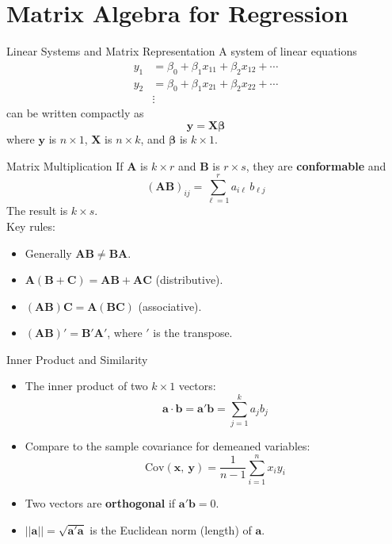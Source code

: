 \documentclass[aspectratio=169, handout, t]{beamer}
\numberwithin{equation}{section}
\begin{document}
\section[Matrices]{Matrix Algebra for Regression}


\begin{frame}{Linear Systems and Matrix Representation}
A system of linear equations
\begin{align*}
y_1&=\beta_0+\beta_1 x_{11}+\beta_2 x_{12}+\cdots\\
y_2&=\beta_0+\beta_1 x_{21}+\beta_2 x_{22}+\cdots\\
&\vdots
\end{align*}
can be written compactly as
$$\bm{y}=\bm{X}\bm{\beta}$$
where $\bm{y}$ is $n\times 1$, $\bm{X}$ is $n\times k$, and $\bm{\beta}$ is $k\times 1$.
\end{frame}

\begin{frame}{Matrix Multiplication}
If $\bm{A}$ is $k\times r$ and $\bm{B}$ is $r \times s$, they are \textbf{conformable} and
$$(\bm{AB})_{ij}=\sum_{\ell=1}^r a_{i\ell}\, b_{\ell j}$$
The result is $k \times s$.\\
\bigskip
Key rules:
\begin{itemize}
\item Generally $\bm{AB}\neq \bm{BA}$.\pause
\item $\bm{A}(\bm{B}+\bm{C})=\bm{AB}+\bm{AC}$ \quad (distributive).
\item $(\bm{AB})\bm{C}=\bm{A}(\bm{BC})$ \quad (associative).\pause
\item $(\bm{AB})'=\bm{B}'\bm{A}'$, where $'$ is the transpose.
\end{itemize}
\end{frame}


\begin{frame}{Inner Product and Similarity}
\begin{itemize}
\item The inner product of two $k\times 1$ vectors:
$$\bm{a}\cdot\bm{b}=\bm{a}'\bm{b}=\sum_{j=1}^k a_jb_j$$\pause
\item Compare to the sample covariance for demeaned variables:
$$\text{Cov}(\bm{x},\ \bm{y})=\frac{1}{n-1}\sum_{i=1}^n x_iy_i$$\pause
\item Two vectors are \textbf{orthogonal} if $\bm{a}'\bm{b}=0$.
\item $||\bm{a}||=\sqrt{\bm{a}'\bm{a}}$ is the Euclidean norm (length) of $\bm{a}$.
\end{itemize}
\end{frame}
\end{document}
